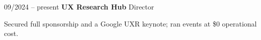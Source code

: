 \begin{twocolentry}{09/2024 – present} \textbf{UX Research Hub} 
    \newline Director \end{twocolentry}
\begin{onecolentry}
\begin{highlights}
\item Secured full sponsorship and a Google UXR keynote; ran events at \$0 operational cost.
\end{highlights}
\end{onecolentry}